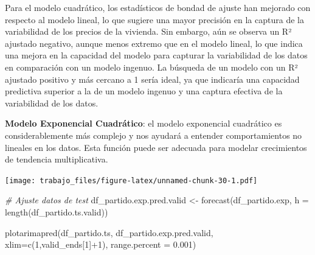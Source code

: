 \documentclass[
]{article}
\newenvironment{Shaded}{\begin{snugshade}}{\end{snugshade}}
\newcommand{\AttributeTok}[1]{\textcolor[rgb]{0.77,0.63,0.00}{#1}}
\newcommand{\CommentTok}[1]{\textcolor[rgb]{0.56,0.35,0.01}{\textit{#1}}}
\newcommand{\DecValTok}[1]{\textcolor[rgb]{0.00,0.00,0.81}{#1}}
\newcommand{\FloatTok}[1]{\textcolor[rgb]{0.00,0.00,0.81}{#1}}
\newcommand{\FunctionTok}[1]{\textcolor[rgb]{0.00,0.00,0.00}{#1}}
\newcommand{\NormalTok}[1]{#1}
\newcommand{\OtherTok}[1]{\textcolor[rgb]{0.56,0.35,0.01}{#1}}
\newcommand{\SpecialCharTok}[1]{\textcolor[rgb]{0.00,0.00,0.00}{#1}}
\newcommand{\StringTok}[1]{\textcolor[rgb]{0.31,0.60,0.02}{#1}}
\begin{document}
Para el modelo cuadrático, los estadísticos de bondad de ajuste han
mejorado con respecto al modelo lineal, lo que sugiere una mayor
precisión en la captura de la variabilidad de los precios de la
vivienda. Sin embargo, aún se observa un R² ajustado negativo, aunque
menos extremo que en el modelo lineal, lo que indica una mejora en la
capacidad del modelo para capturar la variabilidad de los datos en
comparación con un modelo ingenuo. La búsqueda de un modelo con un R²
ajustado positivo y más cercano a 1 sería ideal, ya que indicaría una
capacidad predictiva superior a la de un modelo ingenuo y una captura
efectiva de la variabilidad de los datos.

\textbf{Modelo Exponencial Cuadrático}: el modelo exponencial cuadrático
es considerablemente más complejo y nos ayudará a entender
comportamientos no lineales en los datos. Esta función puede ser
adecuada para modelar crecimientos de tendencia multiplicativa.

\begin{Shaded}
\end{Shaded}

\texttt{[image: trabajo\_files/figure-latex/unnamed-chunk-30-1.pdf]}

\begin{Shaded}
\begin{Highlighting}[]
\CommentTok{\# Ajuste datos de test}
\NormalTok{df\_partido.exp.pred.valid }\OtherTok{\textless{}{-}} \FunctionTok{forecast}\NormalTok{(df\_partido.exp, }\AttributeTok{h =} \FunctionTok{length}\NormalTok{(df\_partido.ts.valid))}

\FunctionTok{plotarimapred}\NormalTok{(df\_partido.ts, df\_partido.exp.pred.valid, }\AttributeTok{xlim=}\FunctionTok{c}\NormalTok{(}\DecValTok{1}\NormalTok{,valid\_ends[}\DecValTok{1}\NormalTok{]}\SpecialCharTok{+}\DecValTok{1}\NormalTok{), }\AttributeTok{range.percent =} \FloatTok{0.001}\NormalTok{)}
\end{Highlighting}
\end{Shaded}
\end{document}
